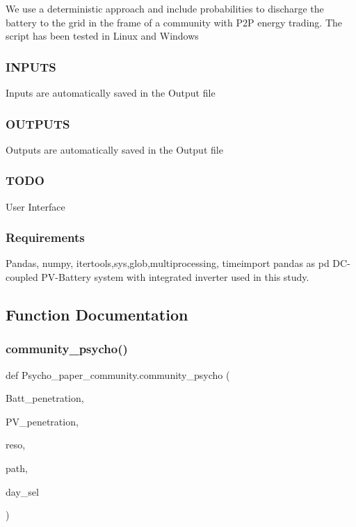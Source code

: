 We use a deterministic approach and include probabilities to discharge the battery to the grid in the frame of a community with P2P energy trading. The script has been tested in Linux and Windows \subsubsection*{I\+N\+P\+U\+TS }

Inputs are automatically saved in the \textquotesingle{}Output\textquotesingle{} file \subsubsection*{O\+U\+T\+P\+U\+TS }

Outputs are automatically saved in the \textquotesingle{}Output\textquotesingle{} file \subsubsection*{T\+O\+DO }

User Interface \subsubsection*{Requirements }

Pandas, numpy, itertools,sys,glob,multiprocessing, timeimport pandas as pd  D\+C-\/coupled P\+V-\/\+Battery system with integrated inverter used in this study.  

\subsection{Function Documentation}
\mbox{\label{namespace_psycho__paper__community_a40671524b3288de32169be3816854d27}} 
\subsubsection{\texorpdfstring{community\+\_\+psycho()}{community\_psycho()}}
{\footnotesize\ttfamily def Psycho\+\_\+paper\+\_\+community.\+community\+\_\+psycho (\begin{DoxyParamCaption}\item[{}]{Batt\+\_\+penetration,  }\item[{}]{P\+V\+\_\+penetration,  }\item[{}]{reso,  }\item[{}]{path,  }\item[{}]{day\+\_\+sel }\end{DoxyParamCaption})}

